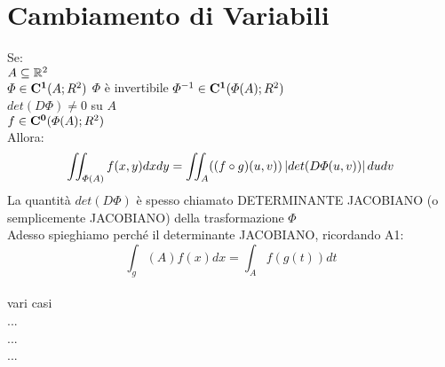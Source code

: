 \section{Cambiamento di Variabili}
Se:\\
$A\subseteq \mathbb{R}^2$\\
$\varPhi\in \mathbf{C^{1}}(A;R^2)$
$\varPhi$ è invertibile
$\varPhi^{-1}\in \mathbf{C^{1}}(\varPhi(A);R^2)$\\
$det(D\varPhi)\ne 0$ su $A$\\
$f\in \mathbf{C^{0}}(\varPhi(A);R^2)$\\
Allora:\\
$$ \iint_{\varPhi(A)}f(x,y)dxdy=\iint_A((f\circ g)(u,v))\left|det(D\varPhi(u,v))\right|dudv$$
La quantità $det(D\varPhi)$ è spesso chiamato DETERMINANTE JACOBIANO (o semplicemente JACOBIANO) della trasformazione $\varPhi$\\
Adesso spieghiamo perché il determinante JACOBIANO, ricordando A1:
$$ \int_g(A)f(x)dx = \int_Af(g(t))dt$$\\
vari casi\\
...\\
...\\
...\\



